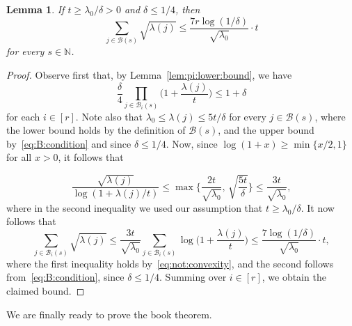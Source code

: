 \documentclass[12pt,reqno]{amsart}
\newtheorem{lemma}[theorem]{Lemma}
\theoremstyle{definition}
\theoremstyle{remark}
\newcommand\N{\mathbb{N}}
\newcommand\cB{\mathcal{B}}
\renewcommand{\le}{\leqslant}
\renewcommand{\ge}{\geqslant}
\def\N{\mathbb{N}}
\def\cB{\mathcal{B}}
\begin{document}
%
\begin{lemma}
	\label{lem:sum:of:lambdas}
	If\/ \(t \ge \lambda_0 / \delta > 0\) and\/ \(\delta \le 1/4\), then
	\begin{equation*}
		\sum_{j \in \cB(s)} \sqrt{\lambda(j)} \le \frac{7r \log(1/\delta)}{\sqrt{\lambda_0}} \cdot t
	\end{equation*}
	for every \(s \in \N\).
\end{lemma}
%
\begin{proof}
	Observe first that, by Lemma~\ref{lem:pi:lower:bound}, we have
	\begin{equation}
		\label{eq:B:condition}
		\frac{\delta}{4} \prod_{j \in \cB_i(s)} \bigg( 1 + \frac{\lambda(j)}{t} \bigg) \le 1 + \delta
	\end{equation}
	for each \(i \in [r]\). Note also that \(\lambda_0 \le \lambda(j) \le 5t/\delta\) for every \(j \in \cB(s)\), where the lower bound holds by the definition of \(\cB(s)\), and the upper bound by~\eqref{eq:B:condition} and since \(\delta \le 1/4\). Now, since \(\log(1+x) \ge \min\{ x/2,1\}\) for all \(x > 0\), it follows that

	\begin{equation}
		\label{eq:not:convexity}
		\frac{ \sqrt{\lambda(j)} }{\log(1 + \lambda(j)/t) } \le \max\bigg\{ \frac{ 2t }{ \sqrt{\lambda_0} }, \, \sqrt{ \frac{5t}{\delta}} \bigg\} \le \frac{ 3t }{ \sqrt{\lambda_0} },
	\end{equation}
	where in the second inequality we used
	our assumption that \(t \ge \lambda_0 / \delta\). It now follows that
	\begin{equation*}
		\sum_{j \in \cB_i(s)} \sqrt{\lambda(j)} \le \frac{ 3t }{ \sqrt{\lambda_0} } \sum_{j \in \cB_i(s)} \log \bigg( 1 + \frac{\lambda(j)}{t} \bigg) \le \frac{7 \log(1/\delta)}{\sqrt{\lambda_0}} \cdot t,
	\end{equation*}
	where the first inequality holds by~\eqref{eq:not:convexity}, and the second follows from~\eqref{eq:B:condition}, since \(\delta \le 1/4\). Summing over \(i \in [r]\), we obtain the claimed bound.
\end{proof}
%

We are finally ready to prove the book theorem.
\end{document}
